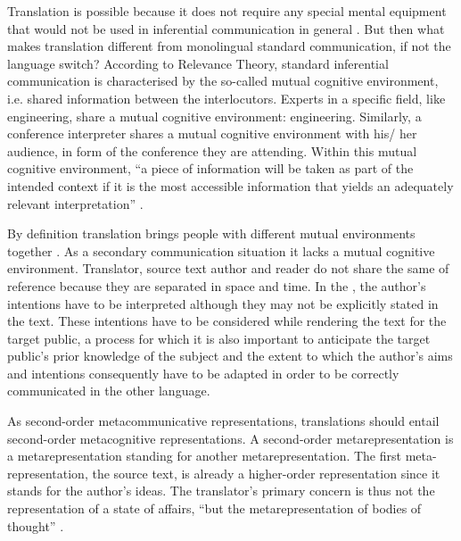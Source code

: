 \documentclass[output=paper]{LSP/langsci}
\begin{document}
Translation is possible because it does not require any special mental equipment that would not be used in inferential communication in general \citep[200]{Gutt2000}. But then what makes translation different from monolingual standard communication, if not the language switch? According to Relevance Theory, standard inferential communication is characterised by the so-called mutual cognitive environment, i.e. shared information between the interlocutors. Experts in a specific field, like engineering, share a mutual cognitive environment: engineering. Similarly, a conference interpreter shares a mutual cognitive environment with his/ her audience, in form of the conference they are attending. Within this mutual cognitive environment, ``a piece of information will be taken as part of the intended context if it is the most accessible information that yields an adequately relevant interpretation'' \citep[2]{Gutt2004}. 


By definition translation brings people with different mutual environments together \citep[5]{Gutt2004}. As a secondary communication situation it lacks a mutual cognitive environment. Translator, source text author and reader do not share the same  of reference because they are separated in space and time. In the , the author's intentions have to be interpreted although they may not be explicitly stated in the text. These intentions have to be considered while rendering the text for the target public, a process for which it is also important to anticipate the target public's prior knowledge of the subject and the extent to which the author's aims and intentions consequently have to be adapted in order to be correctly communicated in the other language.


As second-order metacommunicative representations, translations should entail second-order metacognitive representations. A second-order metarepresentation is a metarepresentation standing for another metarepresentation. The first meta-representation, the source text, is already a higher-order representation since it stands for the author's ideas. The translator's primary concern is thus not the representation of a state of affairs, ``but the metarepresentation of bodies of thought'' \citep[13]{Gutt2004}. 
\end{document}
